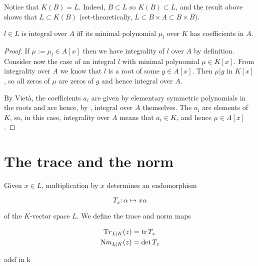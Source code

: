 \documentclass{memoir}
\begin{document}
\begin{remark}
  Notice that $K(B) = L$. Indeed, $B \subset L$ so $K(B) \subset L$, and the
  result above shows that $L \subset K(B)$ (set-theoretically, $L \subset B
  \times A \subset B \times B$).
\end{remark}

\begin{theorem}
  $l \in L$ is integral over $A$ iff its minimal polynomial $\mu_l$ over $K$ has
  coefficients in $A$.
\end{theorem}

\begin{proof}
  If $\mu := \mu_l \in A[x]$ then we have integrality of $l$ over $A$ by
  definition. Consider now the case of an integral $l$ with minimal polynomial
  $\mu \in K[x]$. From integrality over $A$ we know that $l$ is a root of some
  $g \in A[x]$. Then $\mu | g$ in $K[x]$, so all zeros of $\mu$ are zeros of $g$
  and hence integral over $A$.

  \npar By Viet\`a, the coefficients $a_i$ are given by elementary symmetric
  polynomials in the roots and are hence, by
  , integral over $A$ themselves. The $a_i$
  are elements of $K$, so, in this case, integrality over $A$ means that $a_i
  \in K$, and hence $\mu \in A[x]$.
\end{proof}

\section{The trace and the norm}

Given $x \in L$, multiplication by $x$ determines an endomorphism

\[ T_x : \alpha \mapsto x\alpha \]

of the $K$-vector space $L$. We define the trace and norm maps

\noindent
\begin{align*}
{\mathrm Tr}_{L|K}(z) &= \operatorname{tr} T_z\\
{\mathrm Nm}_{L|K}(z) &= \det T_z
\end{align*}
\begin{theorem}
  adsf in  k
\end{theorem}
\end{document}
